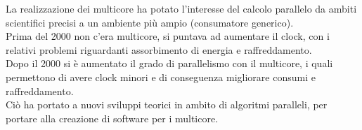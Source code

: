 	La realizzazione dei multicore ha potato l'interesse del calcolo parallelo da ambiti scientifici precisi a un ambiente più ampio (consumatore generico).\\
	
	Prima del 2000 non c'era multicore, si puntava ad aumentare il clock, con i relativi problemi riguardanti assorbimento di energia e raffreddamento.\\
	
	Dopo il 2000 si è aumentato il grado di parallelismo con il multicore, i quali permettono di avere clock minori e di conseguenza migliorare consumi e raffreddamento.\\
	
	Ciò ha portato a nuovi sviluppi teorici in ambito di algoritmi paralleli, per portare alla creazione di software per i multicore.\\
	
	\newpage
	